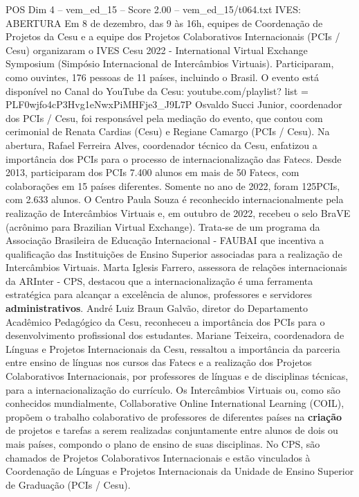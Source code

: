 \begin{textsample}{POS Dim 4 – vem\_ed\_15 – Score 2.00 – vem\_ed\_15/t064.txt}  \label{ex:f4_pos_119}
IVES: ABERTURA Em 8 de dezembro, das 9 às 16h, equipes de Coordenação de Projetos da Cesu e a equipe dos Projetos Colaborativos Internacionais (PCIs / Cesu) organizaram o IVES Cesu 2022 - International Virtual Exchange Symposium (Simpósio Internacional de Intercâmbios Virtuais).
Participaram, como ouvintes, 176 pessoas de 11 países, incluindo o Brasil.
O evento está disponível no Canal do YouTube da Cesu: youtube.com/playlist? list = PLF0wjfo4cP3Hvg1eNwxPiMHFje3\_J9L7P Osvaldo Succi Junior, coordenador dos PCIs / Cesu, foi responsável pela mediação do evento, que contou com cerimonial de Renata Cardias (Cesu) e Regiane Camargo (PCIs / Cesu).
Na abertura, Rafael Ferreira Alves, coordenador técnico da Cesu, enfatizou a importância dos PCIs para o processo de internacionalização das Fatecs.
Desde 2013, participaram dos PCIs 7.400 alunos em mais de 50 Fatecs, com colaborações em 15 países diferentes.
Somente no ano de 2022, foram 125PCIs, com 2.633 alunos.
O Centro Paula Souza é reconhecido internacionalmente pela realização de Intercâmbios Virtuais e, em outubro de 2022, recebeu o selo BraVE (acrônimo para Brazilian Virtual Exchange).
Trata-se de um programa da Associação Brasileira de Educação Internacional - FAUBAI que incentiva a qualificação das Instituições de Ensino Superior associadas para a realização de Intercâmbios Virtuais.
Marta Iglesis Farrero, assessora de relações internacionais da ARInter - CPS, destacou que a internacionalização é uma ferramenta estratégica para alcançar a excelência de alunos, professores e servidores \textbf{administrativos}.
André Luiz Braun Galvão, diretor do Departamento Acadêmico Pedagógico da Cesu, reconheceu a importância dos PCIs para o desenvolvimento profissional dos estudantes.
Mariane Teixeira, coordenadora de Línguas e Projetos Internacionais da Cesu, ressaltou a importância da parceria entre ensino de línguas nos cursos das Fatecs e a realização dos Projetos Colaborativos Internacionais, por professores de línguas e de disciplinas técnicas, para a internacionalização do currículo.
Os Intercâmbios Virtuais ou, como são conhecidos mundialmente, Collaborative Online International Learning (COIL), propõem o trabalho colaborativo de professores de diferentes países na \textbf{criação} de projetos e tarefas a serem realizadas conjuntamente entre alunos de dois ou mais países, compondo o plano de ensino de suas disciplinas.
No CPS, são chamados de Projetos Colaborativos Internacionais e estão vinculados à Coordenação de Línguas e Projetos Internacionais da Unidade de Ensino Superior de Graduação (PCIs / Cesu).

\end{textsample}

